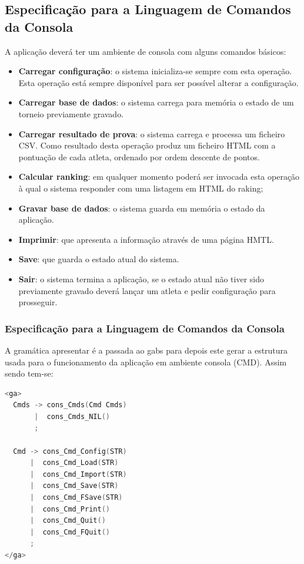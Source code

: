 \documentclass[11pt, a4paper, oneside]{article}
\begin{document}
 
\newpage


\subsection{Especificação para a Linguagem de Comandos da Consola}
A aplicação deverá ter um ambiente de consola com alguns comandos básicos:
\begin{itemize}
\item \textbf{Carregar configuração}: o sistema inicializa-se sempre com esta operação. Esta operação está sempre disponível para ser possível alterar a configuração.
\item \textbf{Carregar base de dados}: o sistema carrega para memória o estado de um torneio previamente gravado.
\item \textbf{Carregar resultado de prova}: o sistema carrega e processa um ficheiro CSV. Como resultado desta operação produz um ficheiro HTML com a pontuação de cada atleta, ordenado por ordem descente de pontos.
\item \textbf{Calcular ranking}: em qualquer momento poderá ser invocada esta operação à qual o sistema responder com uma listagem em HTML do raking;
\item \textbf{Gravar base de dados}: o sistema guarda em memória o estado da aplicação.
\item \textbf{Imprimir}: que apresenta a informação através de uma página HMTL.
\item \textbf{Save}: que guarda o estado atual do sistema.
\item \textbf{Sair}: o sistema termina a aplicação, se o estado atual não tiver sido previamente gravado deverá lançar um atleta e pedir configuração para prosseguir.
\end{itemize}


\subsubsection{Especificação para a Linguagem de Comandos da Consola}
A gramática apresentar é a passada ao gabs para depois este gerar a estrutura usada para o funcionamento da aplicação em ambiente consola (CMD). Assim sendo tem-se:
\begin{lstlisting}[language=C, caption={Gramática para a linguagem de especificação para a linguagem de comandos de consola.}]
<ga>
  Cmds -> cons_Cmds(Cmd Cmds)
       |  cons_Cmds_NIL()
       ;

  Cmd -> cons_Cmd_Config(STR)
      |  cons_Cmd_Load(STR)
      |  cons_Cmd_Import(STR)
      |  cons_Cmd_Save(STR)
      |  cons_Cmd_FSave(STR)
      |  cons_Cmd_Print()
      |  cons_Cmd_Quit()
      |  cons_Cmd_FQuit()
      ;
</ga>
\end{lstlisting}
\end{document}
